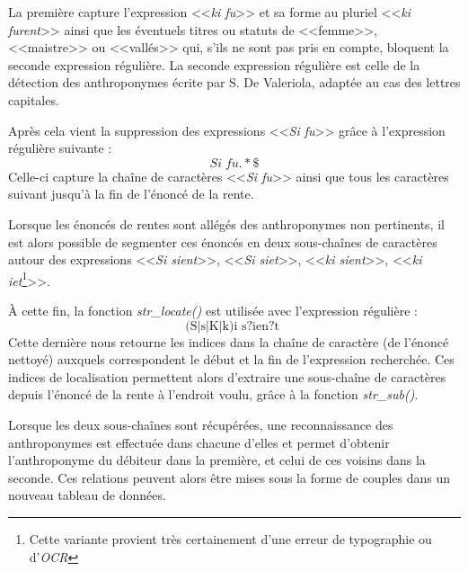 La première capture l'expression <<\textit{ki fu}>> et sa forme au pluriel <<\textit{ki furent}>> ainsi que les éventuels titres ou statuts de <<femme>>, <<maistre>> ou <<vallés>> qui, s'ils ne sont pas pris en compte, bloquent la seconde expression régulière. La seconde expression régulière est celle de la détection des anthroponymes écrite par S. De Valeriola, adaptée au cas des lettres capitales.

Après cela vient la suppression des expressions <<\textit{Si fu}>> grâce à l'expression régulière suivante : 
\[ \boxed{ Si \;fu.*\$} \]
Celle-ci capture la chaîne de caractères <<\textit{Si fu}>> ainsi que tous les caractères suivant jusqu'à la fin de l'énoncé de la rente.

Lorsque les énoncés de rentes sont allégés des anthroponymes non pertinents, il est alors possible de segmenter ces énoncés en deux sous-chaînes de caractères autour des expressions <<\textit{Si sient}>>, <<\textit{Si siet}>>, <<\textit{ki sient}>>, <<\textit{ki iet}\footnote{Cette variante provient très certainement d'une erreur de typographie ou d'\textit{OCR}}>>.

À cette fin, la fonction \textit{str\_locate()} est utilisée avec l'expression régulière :
\[ 
    \boxed{
        \text{
            (S|s|K|k)i s?ien?t
        }
    }
\]
 Cette dernière nous retourne les indices dans la chaîne de caractère (de l'énoncé nettoyé) auxquels correspondent le début et la fin de l'expression recherchée. Ces indices de localisation permettent alors d'extraire une sous-chaîne de caractères depuis l'énoncé de la rente à l'endroit voulu, grâce à la fonction \textit{str\_sub()}.
 
 Lorsque les deux sous-chaînes sont récupérées, une reconnaissance des anthroponymes est effectuée dans chacune d'elles  et permet d'obtenir l'anthroponyme du débiteur dans la première, et celui de ces voisins dans la seconde. Ces relations peuvent alors être mises sous la forme de couples dans un nouveau tableau de données.
 
